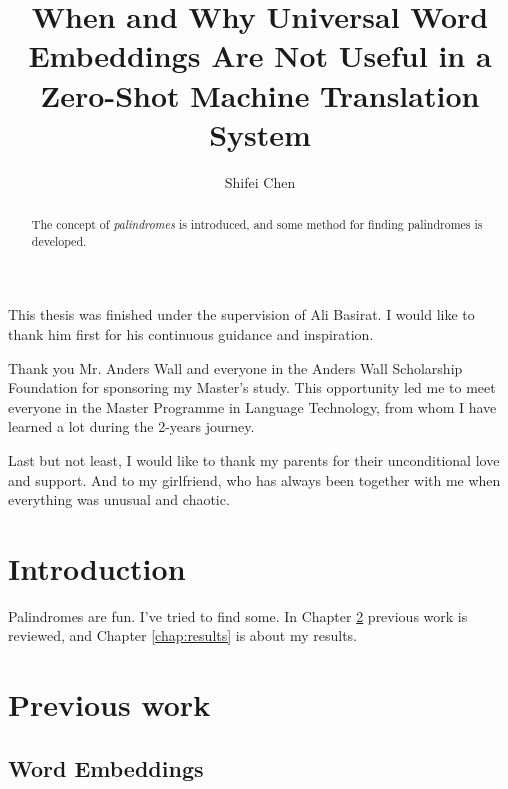 \documentclass[thesis,fonts=libertine]{cluu}
\begin{document}
\author{Shifei Chen}
\title{When and Why Universal Word Embeddings Are Not Useful in a Zero-Shot Machine Translation System}

\maketitle

\begin{abstract}
  The concept of \emph{palindromes} is introduced, and some method for
  finding palindromes is developed.
\end{abstract}

\tableofcontents


This thesis was finished under the supervision of Ali Basirat. I would like 
to thank him first for his continuous guidance and inspiration.

Thank you Mr. Anders Wall and everyone in the Anders Wall Scholarship Foundation for sponsoring my Master's study. This opportunity led me to meet everyone in the Master Programme in Language Technology, from whom I have learned a lot during the 2-years journey.

Last but not least, I would like to thank my parents for their unconditional love and support. And to my girlfriend, who has always been together with me when everything was unusual and chaotic.


\chapter{Introduction}

Palindromes are fun. I've tried to find some.
In Chapter \ref{chap:prev} previous work is reviewed, and
Chapter \ref{chap:results} is about my results.

\chapter{Previous work}
\label{chap:prev}

\section{Word Embeddings}
\end{document}
